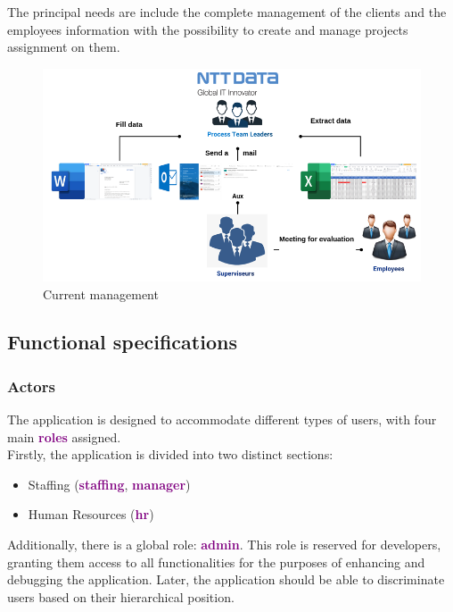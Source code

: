 \documentclass[12pt,a4paper,table,english]{article}
\begin{document}
	The principal needs are include the complete management of the clients and the employees information with the possibility to create and manage projects assignment on them.
	
	\begin{figure}[h!]
		\centering
		\includegraphics[width=0.65\linewidth]{Image/current_app.png}
		\caption{Current management}
		\label{fig:Current management}
	\end{figure}


	\subsection{Functional specifications}
	\subsubsection{Actors}
	The application is designed to accommodate different types of users, with four main \textcolor{purple}{\textbf{roles}} assigned.\\
	Firstly, the application is divided into two distinct sections:\\
	
	\begin{itemize}
		\item Staffing (\textcolor{purple}{\textbf{staffing}}, \textcolor{purple}{\textbf{manager}})
		\item Human Resources (\textcolor{purple}{\textbf{hr}})
	\end{itemize}

	\noindent Additionally, there is a global role: \textcolor{purple}{\textbf{admin}}. This role is reserved for developers, granting them access to all functionalities for the purposes of enhancing and debugging the application.
	Later, the application should be able to discriminate users based on their hierarchical position.
	
	
\end{document}
